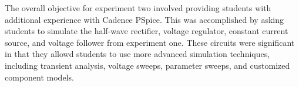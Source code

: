 The overall objective for experiment two involved providing students with
additional experience with Cadence PSpice.  This was accomplished by asking
students to simulate the half-wave rectifier, voltage regulator, constant
current source, and voltage follower from experiment one.  These circuits were
significant in that they allowd students to use more advanced simulation
techniques, including transient analysis, voltage sweeps, parameter sweeps, and
customized component models.

